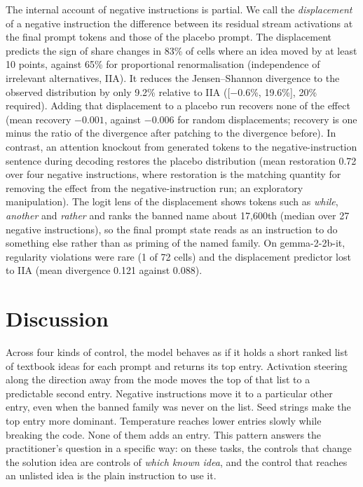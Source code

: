\documentclass[11pt,letterpaper]{article}
\begin{document}
The internal account of negative instructions is partial. We call the \emph{displacement} of a negative instruction the difference between its residual stream activations at the final prompt tokens and those of the placebo prompt. The displacement predicts the sign of share changes in 83\% of cells where an idea moved by at least 10 points, against 65\% for proportional renormalisation (independence of irrelevant alternatives, IIA). It reduces the Jensen--Shannon divergence to the observed distribution by only 9.2\% relative to IIA ([$-0.6$\%, 19.6\%], 20\% required). Adding that displacement to a placebo run recovers none of the effect (mean recovery $-0.001$, against $-0.006$ for random displacements; recovery is one minus the ratio of the divergence after patching to the divergence before). In contrast, an attention knockout from generated tokens to the negative-instruction sentence during decoding restores the placebo distribution (mean restoration 0.72 over four negative instructions, where restoration is the matching quantity for removing the effect from the negative-instruction run; an exploratory manipulation). The logit lens of the displacement shows tokens such as \emph{while}, \emph{another} and \emph{rather} and ranks the banned name about 17{,}600th (median over 27 negative instructions), so the final prompt state reads as an instruction to do something else rather than as priming of the named family. On gemma-2-2b-it, regularity violations were rare (1 of 72 cells) and the displacement predictor lost to IIA (mean divergence 0.121 against 0.088).

\section{Discussion}
\label{sec:discussion}

Across four kinds of control, the model behaves as if it holds a short ranked list of textbook ideas for each prompt and returns its top entry. Activation steering along the direction away from the mode moves the top of that list to a predictable second entry. Negative instructions move it to a particular other entry, even when the banned family was never on the list. Seed strings make the top entry more dominant. Temperature reaches lower entries slowly while breaking the code. None of them adds an entry. This pattern answers the practitioner's question in a specific way: on these tasks, the controls that change the solution idea are controls of \emph{which known idea}, and the control that reaches an unlisted idea is the plain instruction to use it.
\end{document}
